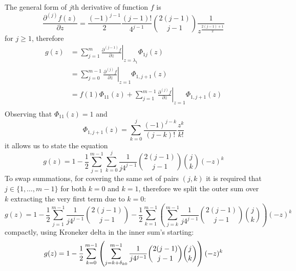The general form of $j$th derivative of function $f$ is 
$$\frac{\partial^{(j)}{f}(z)}{\partial{z}} =\frac{(-1)^{j-1}}{2}\frac{(j-1)!}{4^{j-1}}{{2(j-1)}\choose{j-1}}\frac{1}{z^{\frac{2(j-1)+1}{2}}} $$ 
for $j \geq 1$, therefore
\begin{displaymath}
\begin{split}
  g(z) &= \sum_{j=1}^{m}{ \left. \frac{\partial^{(j-1)}{f}}{\partial{z}} \right|_{z=\lambda_{1}}\Phi_{1j}(z)} \\
       &= \sum_{j=0}^{m-1}{ \left. \frac{\partial^{(j)}{f}}{\partial{z}} \right|_{z=1}\Phi_{1,j+1}(z)} \\
       &= f(1)\Phi_{11}(z) + \sum_{j=1}^{m-1}{ \left. \frac{\partial^{(j)}{f}}{\partial{z}} \right|_{z=1}\Phi_{1,j+1}(z)} \\
\end{split}
\end{displaymath}
Observing that $\Phi_{11}(z)=1$ and
\begin{displaymath}
  \Phi_{1,j+1}(z) = \sum_{k=0}^{j}{\frac{(-1)^{j-k}}{(j-k)!}\frac{z^{k}}{k!}}
\end{displaymath}
it allows us to state the equation
\begin{equation}
  g(z) = 1 - \frac{1}{2} \sum_{j=1}^{m-1}{\sum_{k=0}^{j}{\frac{1}{j 4^{j-1}} {{2(j-1)}\choose{j-1}}{{j}\choose{k}} (-z)^{k}}}
\end{equation}
To swap summations, for covering the same set of pairs $(j, k)$ it is required that 
$j\in \lbrace 1, \ldots, m-1 \rbrace$ for both $k=0$ and $k=1$, therefore we split
the outer sum over $k$ extracting the very first term due to $k=0$:
\begin{equation}
  g(z) = 1 - \frac{1}{2}\sum_{j=1}^{m-1}{\frac{1}{j 4^{j-1}} {{2(j-1)}\choose{j-1}}} 
       - \frac{1}{2} \sum_{k=1}^{m-1}{\left(\sum_{j=k}^{m-1}{\frac{1}{j 4^{j-1}} {{2(j-1)}\choose{j-1}}{{j}\choose{k}}}\right)(-z)^{k}} 
\end{equation}
compactly, using Kroneker delta in the inner sum's starting:
\begin{equation}
  g(z) = 1 - \frac{1}{2} \sum_{k=0}^{m-1}{\left(\sum_{j=k+\delta_{k0}}^{m-1}{\frac{1}{j 4^{j-1}} {{2(j-1)}\choose{j-1}}{{j}\choose{k}}}\right)(-z)^{k}} \\
\end{equation}

